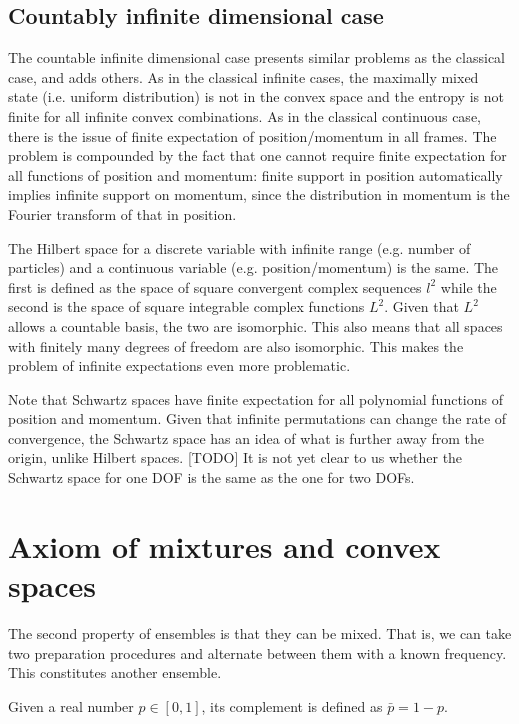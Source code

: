 \subsection{Countably infinite dimensional case}

The countable infinite dimensional case presents similar problems as the classical case, and adds others. As in the classical infinite cases, the maximally mixed state (i.e. uniform distribution) is not in the convex space and the entropy is not finite for all infinite convex combinations. As in the classical continuous case, there is the issue of finite expectation of position/momentum in all frames. The problem is compounded by the fact that one cannot require finite expectation for all functions of position and momentum: finite support in position automatically implies infinite support on momentum, since the distribution in momentum is the Fourier transform of that in position.

The Hilbert space for a discrete variable with infinite range (e.g. number of particles) and a continuous variable (e.g. position/momentum) is the same. The first is defined as the space of square convergent complex sequences $l^2$ while the second is the space of square integrable complex functions $L^2$. Given that $L^2$ allows a countable basis, the two are isomorphic. This also means that all spaces with finitely many degrees of freedom are also isomorphic. This makes the problem of infinite expectations even more problematic.

Note that Schwartz spaces have finite expectation for all polynomial functions of position and momentum. Given that infinite permutations can change the rate of convergence, the Schwartz space has an idea of what is further away from the origin, unlike Hilbert spaces. [TODO] It is not yet clear to us whether the Schwartz space for one DOF is the same as the one for two DOFs.

\section{Axiom of mixtures and convex spaces}

The second property of ensembles is that they can be mixed. That is, we can take two preparation procedures and alternate between them with a known frequency. This constitutes another ensemble.


\begin{defn}
	Given a real number $p \in [0,1]$, its complement is defined as $\bar{p} = 1-p$.
\end{defn}

